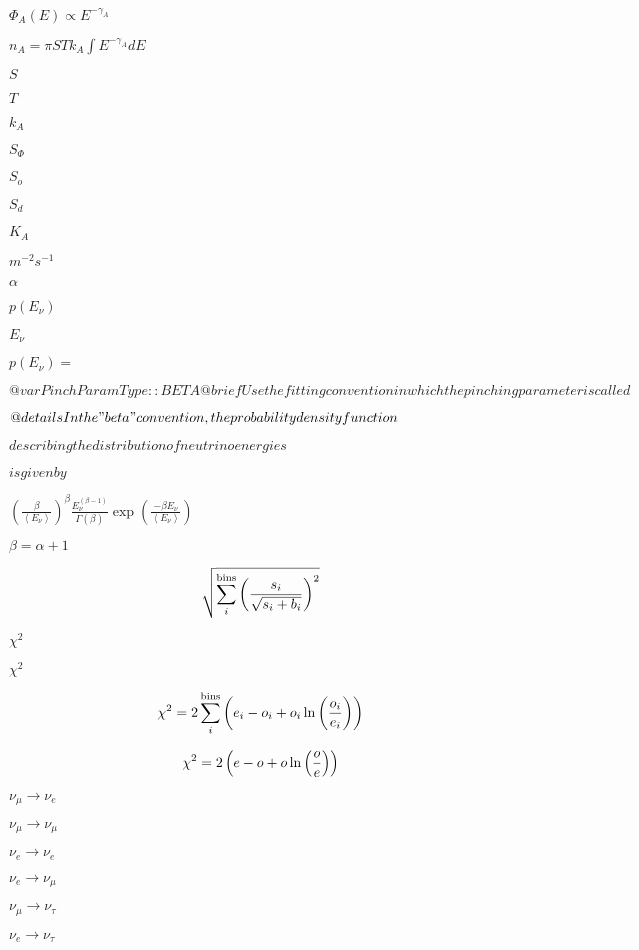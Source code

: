 \documentclass{article}
\begin{document}
$ \Phi_{A}(E) \propto E^{-\gamma_{A}} $
\pagebreak

$ n_{A} = \pi S T k_{A} \int E^{-\gamma_{A}} dE $
\pagebreak

$ S $
\pagebreak

$ T $
\pagebreak

$ k_{A} $
\pagebreak

$ S_{\Phi} $
\pagebreak

$ S_{o} $
\pagebreak

$ S_{d} $
\pagebreak

$ K_{A} $
\pagebreak

$ m^{-2}s^{-1} $
\pagebreak

$\alpha$
\pagebreak

$p(E_\nu)$
\pagebreak

$E_\nu$
\pagebreak

$p(E_\nu) = $
\pagebreak

$ @var PinchParamType::BETA @brief Use the fitting convention in which the pinching parameter is called $
\pagebreak

$ @details In the "beta" convention, the probability density function $
\pagebreak

$ describing the distribution of neutrino energies $
\pagebreak

$ is given by $
\pagebreak

$\left(\frac{\beta}{\left<E_\nu\right>} \right)^{\beta}\frac{E_\nu^(\beta - 1)}{\Gamma(\beta)} \exp\left(\frac{-\beta E_\nu}{\left<E_\nu\right>}\right)$
\pagebreak

$\beta = \alpha + 1$
\pagebreak

\[ \sqrt{\sum_i^{\rm bins}\left({s_i\over\sqrt{s_i+b_i}}\right)^2} \]
\pagebreak

$\chi^2$
\pagebreak

$ \chi^2 $
\pagebreak

\[ \chi^2=2\sum_i^{\rm bins}\left(e_i-o_i+o_i\ln\left({o_i\over e_i}\right)\right) \]
\pagebreak

\[ \chi^2=2\left(e-o+o\ln\left({o\over e}\right)\right) \]
\pagebreak

$ \nu_\mu\to\nu_e $
\pagebreak

$ \nu_\mu\to\nu_\mu $
\pagebreak

$ \nu_e\to\nu_e $
\pagebreak

$ \nu_e\to\nu_\mu $
\pagebreak

$ \nu_\mu\to\nu_\tau $
\pagebreak

$ \nu_e\to\nu_\tau $
\pagebreak
\end{document}
